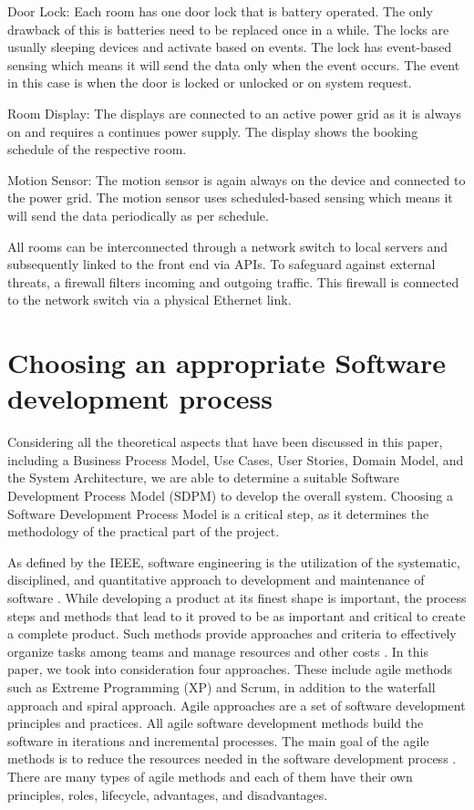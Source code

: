 \documentclass[conference,onecolumn]{IEEEtran}
\begin{document}
	Door Lock: Each room has one door lock that is battery operated. The only drawback of this is batteries need to be replaced once in a while. The locks are usually sleeping devices and activate based on events. The lock has event-based sensing which means it will send the data only when the event occurs. The event in this case is when the door is locked or unlocked or on system request.

	Room Display: The displays are connected to an active power grid as it is always on and requires a continues power supply. The display shows the booking schedule of the respective room.

	Motion Sensor: The motion sensor is again always on the device and connected to the power grid. The motion sensor uses scheduled-based sensing which means it will send the data periodically as per schedule.

	All rooms can be interconnected through a network switch to local servers and subsequently linked to the front end via APIs. To safeguard against external threats, a firewall filters incoming and outgoing traffic. This firewall is connected to the network switch via a physical Ethernet link.

\section{Choosing an appropriate Software development process}


Considering all the theoretical aspects that have been discussed in this paper, including a Business Process Model, Use Cases, User Stories, Domain Model, and the System Architecture, we are able to determine a suitable Software Development Process Model (SDPM) to develop the overall system. Choosing a Software Development Process Model is a critical step, as it determines the methodology of the practical part of the project.

As defined by the IEEE, software engineering is the utilization of the systematic, disciplined, and quantitative approach to development and maintenance of software \cite{a3}. While developing a product at its finest shape is important, the process steps and methods that lead to it proved to be as important and critical to create a complete product. Such methods provide approaches and criteria to effectively organize tasks among teams and manage resources and other costs \cite{a4}. In this paper, we took into consideration four approaches. These include agile methods such as Extreme Programming (XP) and Scrum, in addition to the waterfall approach and spiral approach.
Agile approaches are a set of software development principles and practices. All agile software development methods build the software in iterations and incremental processes. The main goal of the agile methods is to reduce the resources needed in the software development process \cite{a4}. There are many types of agile methods and each of them have their own principles, roles, lifecycle, advantages, and disadvantages.
\end{document}

